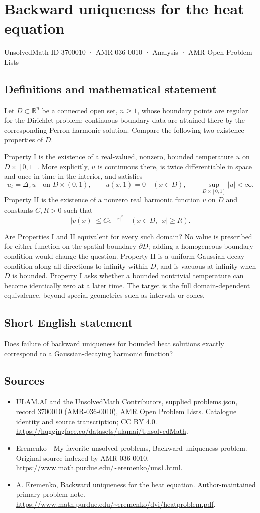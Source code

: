 \documentclass[11pt,a4paper]{article}
\begin{document}
\section*{Backward uniqueness for the heat equation}\label{3700010}
{\small UnsolvedMath ID 3700010 · AMR-036-0010 · Analysis · AMR Open Problem Lists}
\subsection{Definitions and mathematical statement}
Let $D\subset\mathbb R^n$ be a connected open set, $n\geq1$,
whose boundary points are regular for the Dirichlet problem:
continuous boundary data are attained there by the corresponding
Perron harmonic solution. Compare the following two existence
properties of $D$.

Property I is the existence of a real-valued, nonzero, bounded
temperature $u$ on $D\times[0,1]$. More explicitly, $u$ is
continuous there, is twice differentiable in space and once in
time in the interior, and satisfies
\[
 u_t=\Delta_xu\quad\text{on }D\times(0,1),\qquad
 u(x,1)=0\quad(x\in D),\qquad
 \sup_{D\times[0,1]}|u|<\infty.
\]
Property II is the existence of a nonzero real harmonic
function $v$ on $D$ and constants $C,R>0$ such that
\[
             |v(x)|\leq C e^{-|x|^2}
       \quad(x\in D,\ |x|\geq R).
\]

Are Properties I and II equivalent for every such domain?
No value is prescribed for either function on the spatial
boundary $\partial D$; adding a homogeneous boundary
condition would change the question. Property II is a
uniform Gaussian decay condition along all directions to
infinity within $D$, and is vacuous at infinity when $D$
is bounded. Property I asks whether a bounded nontrivial
temperature can become identically zero at a later time.
The target is the full domain-dependent equivalence, beyond
special geometries such as intervals or cones.
\subsection{Short English statement}
Does failure of backward uniqueness for bounded heat solutions exactly correspond to a Gaussian-decaying harmonic function?
\subsection{Sources}
\begin{itemize}
\item[S1] ULAM.AI and the UnsolvedMath Contributors, supplied problems.json, record 3700010 (AMR-036-0010), AMR Open Problem Lists. Catalogue identity and source transcription; CC BY 4.0.
\url{https://huggingface.co/datasets/ulamai/UnsolvedMath}.
\item[S2] Eremenko - My favorite unsolved problems, Backward uniqueness problem. Original source indexed by AMR-036-0010.
\url{https://www.math.purdue.edu/~eremenko/uns1.html}.
\item[S3] A. Eremenko, Backward uniqueness for the heat equation. Author-maintained primary problem note.
\url{https://www.math.purdue.edu/~eremenko/dvi/heatproblem.pdf}.
\end{itemize}
\end{document}
